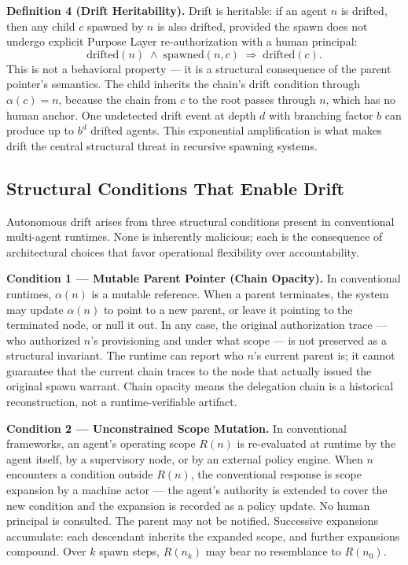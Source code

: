 \medskip
\noindent\textbf{Definition 4 (Drift Heritability).}
Drift is heritable: if an agent $n$ is drifted, then any child $c$ spawned by $n$ is also drifted, provided the spawn does not undergo explicit Purpose Layer re-authorization with a human principal:
\begin{equation}
\mathrm{drifted}(n) \;\land\; \mathrm{spawned}(n, c) \;\Longrightarrow\; \mathrm{drifted}(c).
\label{eq:rs-drift-heritability}
\end{equation}
This is not a behavioral property — it is a structural consequence of the parent pointer's semantics. The child inherits the chain's drift condition through $\alpha(c) = n$, because the chain from $c$ to the root passes through $n$, which has no human anchor. One undetected drift event at depth $d$ with branching factor $b$ can produce up to $b^{d}$ drifted agents. This exponential amplification is what makes drift the central structural threat in recursive spawning systems.

\subsection{Structural Conditions That Enable Drift}
\label{sec:rs-drift-conditions}

Autonomous drift arises from three structural conditions present in conventional multi-agent runtimes. None is inherently malicious; each is the consequence of architectural choices that favor operational flexibility over accountability.

\medskip
\noindent\textbf{Condition 1 — Mutable Parent Pointer (Chain Opacity).}
In conventional runtimes, $\alpha(n)$ is a mutable reference. When a parent terminates, the system may update $\alpha(n)$ to point to a new parent, or leave it pointing to the terminated node, or null it out. In any case, the original authorization trace — who authorized $n$'s provisioning and under what scope — is not preserved as a structural invariant. The runtime can report who $n$'s current parent is; it cannot guarantee that the current chain traces to the node that actually issued the original spawn warrant. Chain opacity means the delegation chain is a historical reconstruction, not a runtime-verifiable artifact.

\medskip
\noindent\textbf{Condition 2 — Unconstrained Scope Mutation.}
In conventional frameworks, an agent's operating scope $R(n)$ is re-evaluated at runtime by the agent itself, by a supervisory node, or by an external policy engine. When $n$ encounters a condition outside $R(n)$, the conventional response is scope expansion by a machine actor — the agent's authority is extended to cover the new condition and the expansion is recorded as a policy update. No human principal is consulted. The parent may not be notified. Successive expansions accumulate: each descendant inherits the expanded scope, and further expansions compound. Over $k$ spawn steps, $R(n_k)$ may bear no resemblance to $R(n_0)$.

